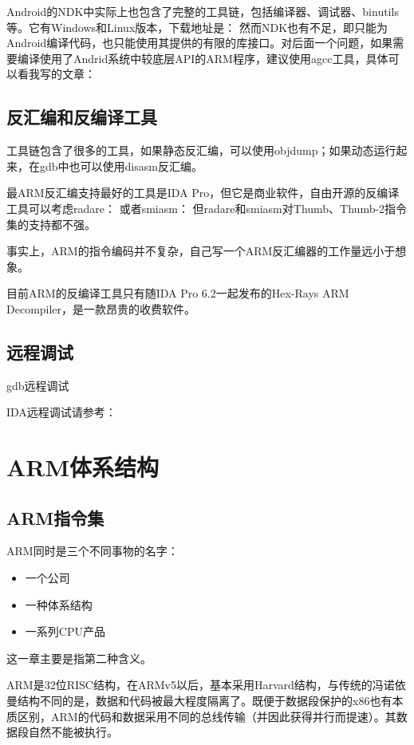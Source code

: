 Android的NDK中实际上也包含了完整的工具链，包括编译器、调试器、binutils等。它有Windows和Linux版本，下载地址是：
然而NDK也有不足，即只能为Android编译代码，也只能使用其提供的有限的库接口。对后面一个问题，如果需要编译使用了Andrid系统中较底层API的ARM程序，建议使用agcc工具，具体可以看我写的文章：
\subsection{反汇编和反编译工具}
工具链包含了很多的工具，如果静态反汇编，可以使用objdump；如果动态运行起来，在gdb中也可以使用disasm反汇编。

最ARM反汇编支持最好的工具是IDA Pro，但它是商业软件，自由开源的反编译工具可以考虑radare：
或者smiasm：
但radare和smiasm对Thumb、Thumb-2指令集的支持都不强。

事实上，ARM的指令编码并不复杂，自己写一个ARM反汇编器的工作量远小于想象。

目前ARM的反编译工具只有随IDA Pro 6.2一起发布的Hex-Rays ARM Decompiler，是一款昂贵的收费软件。
\subsection{远程调试}
gdb远程调试

IDA远程调试请参考：

\section{ARM体系结构}
\subsection{ARM指令集}
ARM同时是三个不同事物的名字：
\begin{itemize}
\item 一个公司
\item 一种体系结构
\item 一系列CPU产品
\end{itemize}
这一章主要是指第二种含义。

ARM是32位RISC结构，在ARMv5以后，基本采用Harvard结构，与传统的冯诺依曼结构不同的是，数据和代码被最大程度隔离了。既便于数据段保护的x86也有本质区别，ARM的代码和数据采用不同的总线传输（并因此获得并行而提速）。其数据段自然不能被执行。

